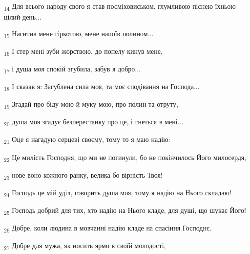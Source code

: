 \begin{tcolorbox}
\textsubscript{14} Для всього народу свого я став посміховиськом, глумливою піснею їхньою цілий день...
\end{tcolorbox}
\begin{tcolorbox}
\textsubscript{15} Наситив мене гіркотою, мене напоїв полином...
\end{tcolorbox}
\begin{tcolorbox}
\textsubscript{16} І стер мені зуби жорствою, до попелу кинув мене,
\end{tcolorbox}
\begin{tcolorbox}
\textsubscript{17} і душа моя спокій згубила, забув я добро...
\end{tcolorbox}
\begin{tcolorbox}
\textsubscript{18} І сказав я: Загублена сила моя, та моє сподівання на Господа...
\end{tcolorbox}
\begin{tcolorbox}
\textsubscript{19} Згадай про біду мою й муку мою, про полин та отруту,
\end{tcolorbox}
\begin{tcolorbox}
\textsubscript{20} душа моя згадує безперестанку про це, і гнеться в мені...
\end{tcolorbox}
\begin{tcolorbox}
\textsubscript{21} Оце я нагадую серцеві своєму, тому то я маю надію:
\end{tcolorbox}
\begin{tcolorbox}
\textsubscript{22} Це милість Господня, що ми не погинули, бо не покінчилось Його милосердя,
\end{tcolorbox}
\begin{tcolorbox}
\textsubscript{23} нове воно кожного ранку, велика бо вірність Твоя!
\end{tcolorbox}
\begin{tcolorbox}
\textsubscript{24} Господь це мій уділ, говорить душа моя, тому я надію на Нього складаю!
\end{tcolorbox}
\begin{tcolorbox}
\textsubscript{25} Господь добрий для тих, хто надію на Нього кладе, для душі, що шукає Його!
\end{tcolorbox}
\begin{tcolorbox}
\textsubscript{26} Добре, коли людина в мовчанні надію кладе на спасіння Господнє.
\end{tcolorbox}
\begin{tcolorbox}
\textsubscript{27} Добре для мужа, як носить ярмо в своїй молодості,
\end{tcolorbox}
